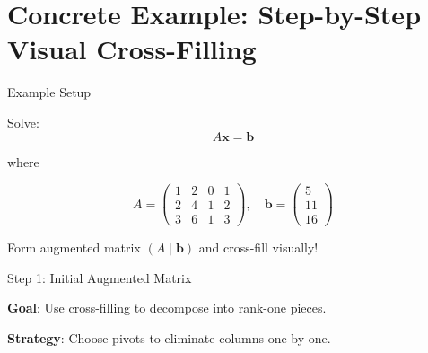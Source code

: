 \documentclass[10pt]{beamer}
\theoremstyle{definition}
\newcommand{\x}[1]{\alert{\textbf{#1}}}
\begin{document}
\section{Concrete Example: Step-by-Step Visual Cross-Filling}

\begin{frame}{Example Setup}

Solve:
$$A\mathbf{x} = \mathbf{b}$$

where

$$A = \begin{pmatrix}
1 & 2 & 0 & 1 \\
2 & 4 & 1 & 2 \\
3 & 6 & 1 & 3
\end{pmatrix}, \quad \mathbf{b} = \begin{pmatrix} 5 \\ 11 \\ 16 \end{pmatrix}$$

\vspace{1em}

Form augmented matrix $(A \mid \mathbf{b})$ and cross-fill visually!

\end{frame}

\begin{frame}[fragile]{Step 1: Initial Augmented Matrix}

\begin{center}
\end{center}

\vspace{1em}

\x{Goal}: Use cross-filling to decompose into rank-one pieces.

\vspace{0.5em}

\x{Strategy}: Choose pivots to eliminate columns one by one.

\end{frame}
\end{document}
